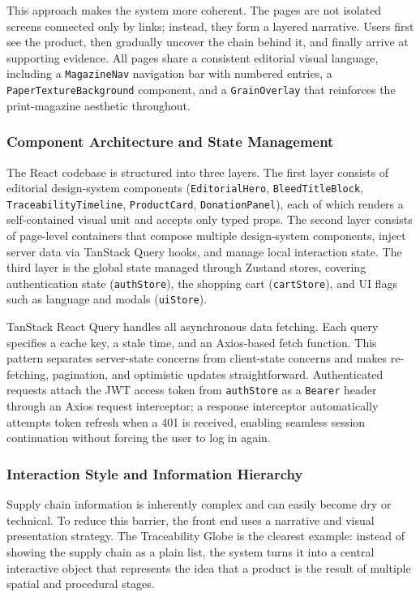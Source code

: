 \documentclass[11pt]{article}
\begin{document}
This approach makes the system more coherent. The pages are not isolated screens connected only by links; instead, they form a layered narrative. Users first see the product, then gradually uncover the chain behind it, and finally arrive at supporting evidence. All pages share a consistent editorial visual language, including a \texttt{MagazineNav} navigation bar with numbered entries, a \texttt{PaperTextureBackground} component, and a \texttt{GrainOverlay} that reinforces the print-magazine aesthetic throughout.

\subsubsection{Component Architecture and State Management}
The React codebase is structured into three layers. The first layer consists of editorial design-system components (\texttt{EditorialHero}, \texttt{BleedTitleBlock}, \texttt{TraceabilityTimeline}, \texttt{ProductCard}, \texttt{DonationPanel}), each of which renders a self-contained visual unit and accepts only typed props. The second layer consists of page-level containers that compose multiple design-system components, inject server data via TanStack Query hooks, and manage local interaction state. The third layer is the global state managed through Zustand stores, covering authentication state (\texttt{authStore}), the shopping cart (\texttt{cartStore}), and UI flags such as language and modals (\texttt{uiStore}).

TanStack React Query handles all asynchronous data fetching. Each query specifies a cache key, a stale time, and an Axios-based fetch function. This pattern separates server-state concerns from client-state concerns and makes re-fetching, pagination, and optimistic updates straightforward. Authenticated requests attach the JWT access token from \texttt{authStore} as a \texttt{Bearer} header through an Axios request interceptor; a response interceptor automatically attempts token refresh when a 401 is received, enabling seamless session continuation without forcing the user to log in again.

\subsubsection{Interaction Style and Information Hierarchy}
Supply chain information is inherently complex and can easily become dry or technical. To reduce this barrier, the front end uses a narrative and visual presentation strategy. The Traceability Globe is the clearest example: instead of showing the supply chain as a plain list, the system turns it into a central interactive object that represents the idea that a product is the result of multiple spatial and procedural stages.
\end{document}
